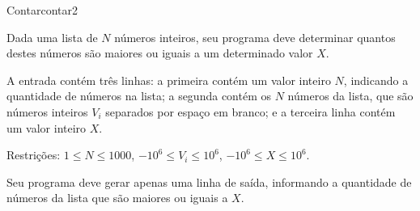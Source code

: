 \documentclass[12pt,a4paper,oneside]{article}
\begin{document}
\begin{problem}{Contar}{contar}{2}
 
Dada uma lista de $N$ números inteiros, seu programa deve determinar quantos destes números são maiores ou iguais a um determinado valor $X$.

%

\InputFile

A entrada contém três linhas: a primeira contém um valor inteiro $N$, indicando a quantidade de números na lista; a segunda contém os $N$ números da lista, que são números inteiros $V_i$ separados por espaço em branco; e a terceira linha contém um valor inteiro $X$.

Restrições: $1 \leq N \leq 1000$, $-10^6 \leq V_i \leq 10^6$, $-10^6 \leq X \leq 10^6$.



\OutputFile

Seu programa deve gerar apenas uma linha de saída, informando a quantidade de números da lista que são maiores ou iguais a $X$.


\Example

\begin{example}
%
\end{example}

\begin{example}
%
\end{example}

\begin{example}
%
\end{example}

\begin{example}
%
\end{example}


\end{problem}
\end{document}
